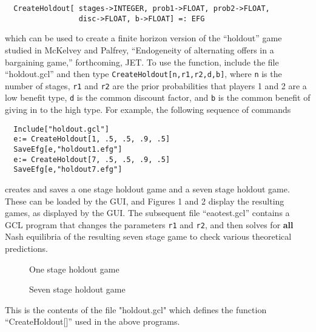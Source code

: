\begin{verbatim}
  CreateHoldout[ stages->INTEGER, prob1->FLOAT, prob2->FLOAT, 
                 disc->FLOAT, b->FLOAT] =: EFG
\end{verbatim}

\noindent
which can be used to create a finite horizon version of the
``holdout'' game studied in McKelvey and Palfrey, ``Endogeneity of
alternating offers in a bargaining game,'' forthcoming, JET.  To use
the function, include the file ``holdout.gcl'' and then type
\verb+CreateHoldout[n,r1,r2,d,b]+, where \verb+n+ is the number of
stages, \verb+r1+ and \verb+r2+ are the prior probabilities that
players 1 and 2 are a low benefit type, \verb+d+ is the common
discount factor, and \verb+b+ is the common benefit of giving in to
the high type.  For example, the following sequence of commands

\begin{verbatim}
  Include["holdout.gcl"]
  e:= CreateHoldout[1, .5, .5, .9, .5]
  SaveEfg[e,"holdout1.efg"]
  e:= CreateHoldout[7, .5, .5, .9, .5]
  SaveEfg[e,"holdout7.efg"]
\end{verbatim}

\noindent
creates and saves a one stage holdout game and a seven stage holdout
game. These can be loaded by the GUI, and Figures 1 and 2 display the
resulting games, as displayed by the GUI.  The subsequent file
``eaotest.gcl'' contains a GCL program that changes the parameters
\verb+r1+ and \verb+r2+, and then solves for {\bf all} Nash equilibria
of the resulting seven stage game to check various theoretical predictions.

\begin{figure}[htp]
\caption{One stage holdout game}
\end{figure}
\begin{figure}[htp]
\caption{Seven stage holdout game}
\end{figure}

\newpage
\noindent
This is the contents of the file "holdout.gcl" which defines the
function ``CreateHoldout[]'' used in the above programs.


